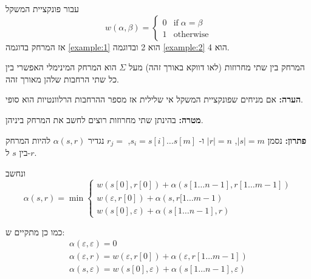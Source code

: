 עבור פונקציית המשקל
$$
w(\alpha, \beta) = 
\begin{cases}
0	& \text{if}\; \alpha = \beta
\\
1	& \text{otherwise}
\end{cases}
$$
אז המרחק בדוגמה 
\ref{example:1}
הוא 2 ובדוגמה
\ref{example:2}
הוא 4.

\begin{definition}[מרחק]
המרחק בין שתי מחרוזות (לאו דווקא באורך זהה) מעל 
$\Sigma$
הוא המרחק המינימלי האפשרי בין כל שתי הרחבות שלהן מאורך זהה.
\end{definition}

\textbf{הערה:}
אם מניחים שפונקציית המשקל אי שלילית אז מספר ההרחבות הרלוונטיות הוא סופי.


\textbf{מטרה:}
בהינתן שתי מחרוזות רוצים לחשב את המרחק ביניהן.

\textbf{פתרון:}
נסמן 
$|s| = m$,
$|r| = n$
ו-%
$s_i = s[i] \ldots s[m]$,
$r_j = $
נגדיר
$\alpha(s, r)$
להיות המרחק בין $s$ ל-$r$.


ונחשב
$$
\alpha(s, r) = \min
\begin{cases}
w(s[0], r[0]) + \alpha(s[1 \ldots n - 1], r[1 \ldots m - 1])
\\
w(\varepsilon, r[0]) + \alpha(s, r[1 \ldots m - 1)
\\
w(s[0], \varepsilon) + \alpha(s[1 \ldots n - 1], r)
\end{cases}
$$

כמו כן מתקיים ש:%
$$
\begin{array}{l}
\alpha(\varepsilon, \varepsilon) = 0
\\
\alpha(\varepsilon, r) = w(\varepsilon, r[0]) + \alpha(\varepsilon, r[1 \ldots m - 1])
\\
\alpha(s, \varepsilon) = w(s[0], \varepsilon) + \alpha(s[1 \ldots n - 1], \varepsilon)
\end{array}
$$
